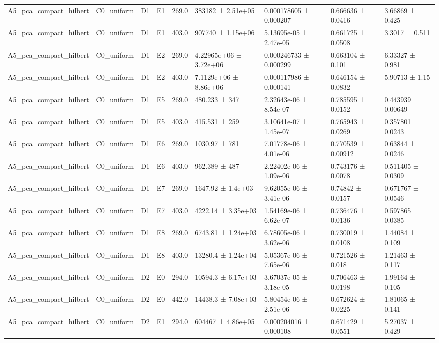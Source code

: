 \begin{table}
\begin{tabular}{lllllllll}
A5\_pca\_compact\_hilbert & C0\_uniform & D1 & E1 & 269.0 & 383182 ± 2.51e+05 & 0.000178605 ± 0.000207 & 0.666636 ± 0.0416 & 3.66869 ± 0.425 \\
A5\_pca\_compact\_hilbert & C0\_uniform & D1 & E1 & 403.0 & 907740 ± 1.15e+06 & 5.13695e-05 ± 2.47e-05 & 0.661725 ± 0.0508 & 3.3017 ± 0.511 \\
A5\_pca\_compact\_hilbert & C0\_uniform & D1 & E2 & 269.0 & 4.22965e+06 ± 3.72e+06 & 0.000246733 ± 0.000299 & 0.663104 ± 0.101 & 6.33327 ± 0.981 \\
A5\_pca\_compact\_hilbert & C0\_uniform & D1 & E2 & 403.0 & 7.1129e+06 ± 8.86e+06 & 0.000117986 ± 0.000141 & 0.646154 ± 0.0832 & 5.90713 ± 1.15 \\
A5\_pca\_compact\_hilbert & C0\_uniform & D1 & E5 & 269.0 & 480.233 ± 347 & 2.32643e-06 ± 8.54e-07 & 0.785595 ± 0.0152 & 0.443939 ± 0.00649 \\
A5\_pca\_compact\_hilbert & C0\_uniform & D1 & E5 & 403.0 & 415.531 ± 259 & 3.10641e-07 ± 1.45e-07 & 0.765943 ± 0.0269 & 0.357801 ± 0.0243 \\
A5\_pca\_compact\_hilbert & C0\_uniform & D1 & E6 & 269.0 & 1030.97 ± 781 & 7.01778e-06 ± 4.01e-06 & 0.770539 ± 0.00912 & 0.63844 ± 0.0246 \\
A5\_pca\_compact\_hilbert & C0\_uniform & D1 & E6 & 403.0 & 962.389 ± 487 & 2.22402e-06 ± 1.09e-06 & 0.743176 ± 0.0078 & 0.511405 ± 0.0309 \\
A5\_pca\_compact\_hilbert & C0\_uniform & D1 & E7 & 269.0 & 1647.92 ± 1.4e+03 & 9.62055e-06 ± 3.41e-06 & 0.74842 ± 0.0157 & 0.671767 ± 0.0546 \\
A5\_pca\_compact\_hilbert & C0\_uniform & D1 & E7 & 403.0 & 4222.14 ± 3.35e+03 & 1.54169e-06 ± 6.62e-07 & 0.736476 ± 0.0136 & 0.597865 ± 0.0385 \\
A5\_pca\_compact\_hilbert & C0\_uniform & D1 & E8 & 269.0 & 6743.81 ± 1.24e+03 & 6.78605e-06 ± 3.62e-06 & 0.730019 ± 0.0108 & 1.44084 ± 0.109 \\
A5\_pca\_compact\_hilbert & C0\_uniform & D1 & E8 & 403.0 & 13280.4 ± 1.24e+04 & 5.05367e-06 ± 7.65e-06 & 0.721526 ± 0.018 & 1.21463 ± 0.117 \\
A5\_pca\_compact\_hilbert & C0\_uniform & D2 & E0 & 294.0 & 10594.3 ± 6.17e+03 & 3.67037e-05 ± 3.18e-05 & 0.706463 ± 0.0198 & 1.99164 ± 0.105 \\
A5\_pca\_compact\_hilbert & C0\_uniform & D2 & E0 & 442.0 & 14438.3 ± 7.08e+03 & 5.80454e-06 ± 2.51e-06 & 0.672624 ± 0.0225 & 1.81065 ± 0.141 \\
A5\_pca\_compact\_hilbert & C0\_uniform & D2 & E1 & 294.0 & 604467 ± 4.86e+05 & 0.000204016 ± 0.000108 & 0.671429 ± 0.0551 & 5.27037 ± 0.429 \\

\end{tabular}
\end{table}
